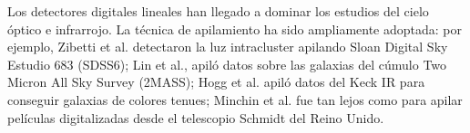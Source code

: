 Los detectores digitales lineales han llegado a dominar los estudios
del cielo óptico e infrarrojo. La técnica de apilamiento ha sido
ampliamente adoptada: por ejemplo, Zibetti et al. detectaron la luz
intracluster apilando Sloan Digital Sky Estudio 683 (SDSS6); Lin et
al., apiló datos sobre las galaxias del cúmulo Two Micron All Sky
Survey (2MASS); Hogg et al. apiló datos del Keck IR para conseguir
galaxias de colores tenues; Minchin et al. fue tan lejos como para
apilar películas digitalizadas desde el telescopio Schmidt del Reino
Unido.
